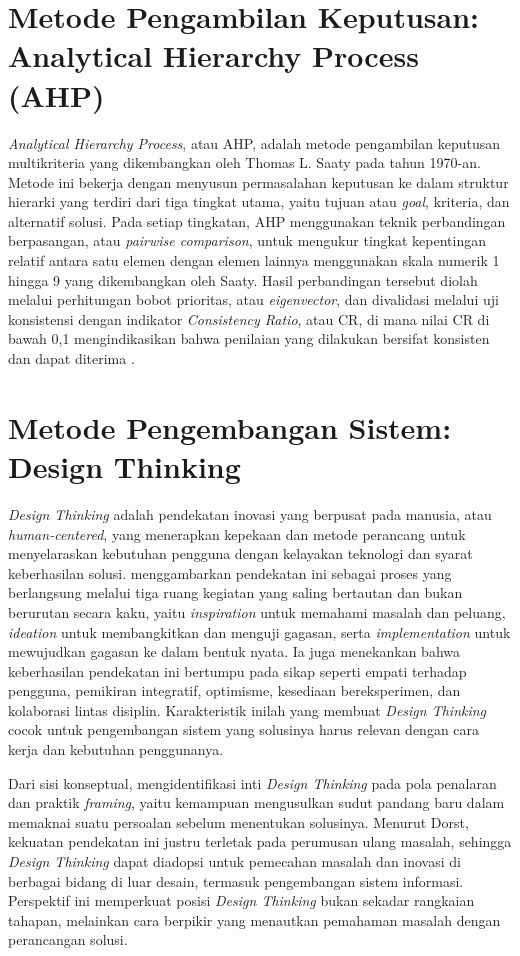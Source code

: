 \section{Metode Pengambilan Keputusan: Analytical Hierarchy Process (AHP)}
\label{sec:ahp}

\textit{Analytical Hierarchy Process}, atau AHP, adalah metode pengambilan keputusan multikriteria yang dikembangkan oleh Thomas L. Saaty pada tahun 1970-an. Metode ini bekerja dengan menyusun permasalahan keputusan ke dalam struktur hierarki yang terdiri dari tiga tingkat utama, yaitu tujuan atau \textit{goal}, kriteria, dan alternatif solusi. Pada setiap tingkatan, AHP menggunakan teknik perbandingan berpasangan, atau \textit{pairwise comparison}, untuk mengukur tingkat kepentingan relatif antara satu elemen dengan elemen lainnya menggunakan skala numerik 1 hingga 9 yang dikembangkan oleh Saaty. Hasil perbandingan tersebut diolah melalui perhitungan bobot prioritas, atau \textit{eigenvector}, dan divalidasi melalui uji konsistensi dengan indikator \textit{Consistency Ratio}, atau CR, di mana nilai CR di bawah 0,1 mengindikasikan bahwa penilaian yang dilakukan bersifat konsisten dan dapat diterima \autocite{saaty1977}.

\section{Metode Pengembangan Sistem: Design Thinking}
\label{sec:design-thinking}

\textit{Design Thinking} adalah pendekatan inovasi yang berpusat pada manusia, atau \textit{human-centered}, yang menerapkan kepekaan dan metode perancang untuk menyelaraskan kebutuhan pengguna dengan kelayakan teknologi dan syarat keberhasilan solusi. \textcite{brown2008} menggambarkan pendekatan ini sebagai proses yang berlangsung melalui tiga ruang kegiatan yang saling bertautan dan bukan berurutan secara kaku, yaitu \textit{inspiration} untuk memahami masalah dan peluang, \textit{ideation} untuk membangkitkan dan menguji gagasan, serta \textit{implementation} untuk mewujudkan gagasan ke dalam bentuk nyata. Ia juga menekankan bahwa keberhasilan pendekatan ini bertumpu pada sikap seperti empati terhadap pengguna, pemikiran integratif, optimisme, kesediaan bereksperimen, dan kolaborasi lintas disiplin. Karakteristik inilah yang membuat \textit{Design Thinking} cocok untuk pengembangan sistem yang solusinya harus relevan dengan cara kerja dan kebutuhan penggunanya.

Dari sisi konseptual, \textcite{dorst2011} mengidentifikasi inti \textit{Design Thinking} pada pola penalaran dan praktik \textit{framing}, yaitu kemampuan mengusulkan sudut pandang baru dalam memaknai suatu persoalan sebelum menentukan solusinya. Menurut Dorst, kekuatan pendekatan ini justru terletak pada perumusan ulang masalah, sehingga \textit{Design Thinking} dapat diadopsi untuk pemecahan masalah dan inovasi di berbagai bidang di luar desain, termasuk pengembangan sistem informasi. Perspektif ini memperkuat posisi \textit{Design Thinking} bukan sekadar rangkaian tahapan, melainkan cara berpikir yang menautkan pemahaman masalah dengan perancangan solusi.

